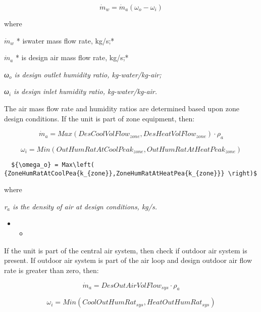 \begin{equation}
{\dot m_w} = {\dot m_a}\left( {{\omega_o} - {\omega_i}} \right)
\end{equation}

where

\({\dot m_w}\) * iswater mass flow rate, kg/s;*

\({\dot m_a}\) * is design air mass flow rate, kg/s;*

\emph{ω\(_{o}\) is design outlet humidity ratio, kg-water/kg-air;}

\emph{ω\(_{i}\) is design inlet humidity ratio, kg-water/kg-air.}

The air mass flow rate and humidity ratios are determined based upon zone design conditions. If the unit is part of zone equipment, then:

\begin{equation}
{\dot m_a} = Max\left( {DesCoolVolFlo{w_{zone}},DesHeatVolFlo{w_{zone}}} \right) \cdot {\rho_a}
\end{equation}

\begin{equation}
{\omega_i} = Min\left( {OutHumRatAtCoolPea{k_{zone}},OutHumRatAtHeatPea{k_{zone}}} \right)
\end{equation}

\begin{lstlisting}
  ${\omega_o} = Max\left( {ZoneHumRatAtCoolPea{k_{zone}},ZoneHumRatAtHeatPea{k_{zone}}} \right)$ 
\end{lstlisting}

where

\emph{r\(_{a}\) is the density of air at design conditions, kg/s.}

\begin{itemize}
\item
  \begin{itemize}
  \item
  \end{itemize}
\end{itemize}

If the unit is part of the central air system, then check if outdoor air system is present. If outdoor air system is part of the air loop and design outdoor air flow rate is greater than zero, then:

\begin{equation}
{\dot m_a} = DesOutAirVolFlo{w_{sys}} \cdot {\rho_a}
\end{equation}

\begin{equation}
{\omega_i} = Min\left( {CoolOutHumRa{t_{sys}},HeatOutHumRa{t_{sys}}} \right)
\end{equation}

